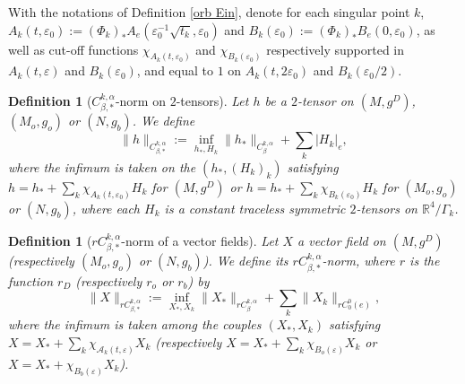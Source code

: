 \documentclass[11pt,reqno]{amsart}
\numberwithin{equation}{section}
\newtheorem{defn}[thm]{Definition}
\theoremstyle{definition}
\theoremstyle{remark}
\begin{document}
 With the notations of Definition \ref{orb Ein}, denote for each singular point $k$, $A_k(t,\varepsilon_0) := (\Phi_k)_*A_{{e}}(\varepsilon_0^{-1}\sqrt{t_k},\varepsilon_0)$ and $B_k(\varepsilon_0):=(\Phi_k)_*B_{{e}}(0,\varepsilon_0)$, as well as cut-off functions $\chi_{A_k(t,\varepsilon_0)}$ and $\chi_{B_k(\varepsilon_0)}$ respectively supported in $A_k(t,\varepsilon)$ and $B_k(\varepsilon_0)$, and equal to $1$ on $A_k(t,2\varepsilon_0)$ and $B_k(\varepsilon_0/2)$.

\begin{defn}[$C^{k,\alpha}_{\beta,*}$-norm on $2$-tensors]\label{def: Ckalphabeta*}
    Let $ h $ be a $2$-tensor on $(M,g^D)$, $(M_o,g_o)$ or $(N,g_b)$. We define
    $$\|h\|_{C^{k,\alpha}_{\beta,*}}:= \inf_{h_*,H_k} \|h_*\|_{C^{k,\alpha}_{\beta}} + \sum_k |H_k|_{{e}},$$
    where the infimum is taken on the $(h_*,(H_k)_k)$ satisfying $h= h_*+\sum_k \chi_{A_k(t,\varepsilon_0)}H_k$ for $(M,g^D)$ or $h= h_*+\sum_k \chi_{B_k(\varepsilon_0)}H_k$ for $(M_o,g_o)$ or $(N,g_b)$, where each $H_k$ is a constant traceless symmetric $2$-tensors on $\mathbb{R}^4\slash\Gamma_k$.
\end{defn}

\begin{defn}[$rC^{k,\alpha}_{\beta,*}$-norm of a vector fields]
    Let $ X $ a vector field on $(M,g^D)$ (respectively $(M_o,g_o)$ or $(N,g_b)$). We define its $rC^{k,\alpha}_{\beta,*}$-norm, where $r$ is the function $r_D$ (respectively $r_o$ or $r_b$) by
    $$\|X\|_{rC^{k,\alpha}_{\beta,*}}:= \inf_{X_*,X_k}\|X_*\|_{rC^{k,\alpha}_{\beta}} + \sum_k \|X_k\|_{rC^0_0(e)},$$
    where the infimum is taken among the couples $(X_*,X_k)$ satisfying $X = X_* + \sum_k\chi_{\mathcal{A}_k(t,\varepsilon)}X_k$ (respectively $X = X_* + \sum_k\chi_{B_o(\varepsilon)}X_k$ or $X = X_* + \chi_{B_b(\varepsilon)}X_k$).
\end{defn}
\end{document}
